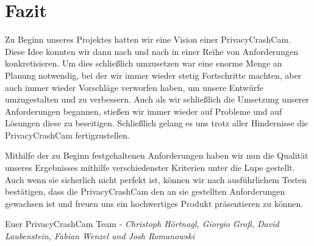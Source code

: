 \chapter{Fazit}
Zu Beginn unseres Projektes hatten wir eine Vision einer PrivacyCrashCam. Diese Idee konnten wir dann nach und nach in einer Reihe von Anforderungen konkretisieren. Um dies schließlich umzusetzen war eine enorme Menge an Planung notwendig, bei der wir immer wieder stetig Fortschritte machten, aber auch immer wieder Vorschläge verworfen haben, um unsere Entwürfe umzugestalten und zu verbessern. Auch als wir schließlich die Umsetzung unserer Anforderungen begannen, stießen wir immer wieder auf Probleme und auf Lösungen diese zu beseitigen. Schließlich gelang es uns trotz aller Hindernisse die PrivacyCrashCam fertigzustellen.\par
Mithilfe der zu Beginn festgehaltenen Anforderungen haben wir nun die Qualität unseres Ergebnisses mithilfe verschiedenster Kriterien unter die Lupe gestellt. Auch wenn sie sicherlich nicht perfekt ist, können wir nach ausführlichem Testen bestätigen, dass die PrivacyCrashCam den an sie gestellten Anforderungen gewachsen ist und freuen uns ein hochwertiges Produkt präsentieren zu können.\newline
 
Euer PrivacyCrashCam Team - \newline
\textit{Christoph Hörtnagl, Giorgio Groß, David Laubenstein, Fabian Wenzel und Josh Romanowski}